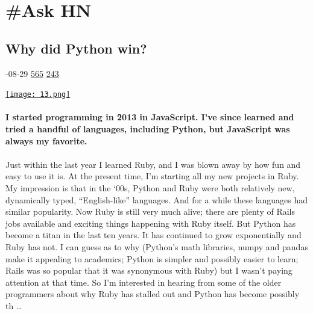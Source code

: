\documentclass[10pt,a4paper]{article}
\begin{document}
\section{\#Ask HN}

\begin{multicols}{2}
\raggedcolumns
\noindent\begin{minipage}{\linewidth}
\medskip
\subsection{Why did Python win?}
\textsc{\footnotesize
{\scriptsize\faCalendar}-08-29 
{\scriptsize\faThumbsOUp}\space 
\href{}{565} 
{\scriptsize\faComments}\space 
\href{}{243} 
}
\par\medskip\noindent
\href{https://news.ycombinator.com/item?id=37308747\&utm\_source=hackernewsletter\&utm\_medium=email\&utm\_term=ask\_hn}{
    \texttt{[image: 13.png]}
}
\end{minipage}
\paragraph{}
\textbf{I started programming in \~2013 in JavaScript. I’ve since learned and tried a handful of languages, including Python, but JavaScript was always my favorite.}
\paragraph{}
 Just within the last year I learned Ruby, and I was blown away by how fun and easy to use it is. At the present time, I’m starting all my new projects in Ruby.
My impression is that in the ‘00s, Python and Ruby were both relatively new, dynamically typed, “English-like” languages. And for a while these languages had similar popularity.
Now Ruby is still very much alive; there are plenty of Rails jobs available and exciting things happening with Ruby itself. But Python has become a titan in the last ten years. It has continued to grow exponentially and Ruby has not.
I can guess as to why (Python’s math libraries, numpy and pandas make it appealing to academics; Python is simpler and possibly easier to learn; Rails was so popular that it was synonymous with Ruby) but I wasn’t paying attention at that time. So I’m interested in hearing from some of the older programmers about why Ruby has stalled out and Python has become possibly th
\dots\par
\noindent\begin{minipage}{\linewidth}
\medskip

\end{minipage}
\end{multicols}
\end{document}
